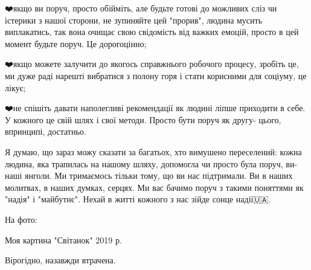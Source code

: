 ❤️якщо ви поруч, просто обійміть, але будьте готові до можливих сліз чи істерики
з нашої сторони, не зупиняйте цей "прорив", людина мусить виплакатись, так вона
очищає свою свідомість від важких емоцій, просто в цей момент будьте поруч. Це
дорогоцінно;

❤️якщо можете залучити до якогось справжнього робочого процесу, зробіть це, ми
дуже раді нарешті вибратися з полону горя і стати корисними для соціуму, це
лікує;

❤️не спішіть давати наполегливі рекомендації як людині ліпше приходити в себе. У
кожного це свій шлях і свої методи. Просто бути поруч як другу- цього,
впринципі, достатньо.

Я думаю, що зараз можу сказати за багатьох, хто вимушено переселений: кожна
людина, яка трапилась на нашому шляху, допомогла чи просто була поруч, ви- наші
янголи. Ми тримаємось тільки тому, що ви нас підтримали. Ви в наших молитвах, в
наших думках, серцях. Ми вас бачимо поруч з такими поняттями як "надія" і
"майбутнє". Нехай в житті кожного з нас зійде сонце надії🇺🇦.

На фото: 

Моя картина "Світанок" 2019 р. 

Вірогідно, назавжди втрачена.

